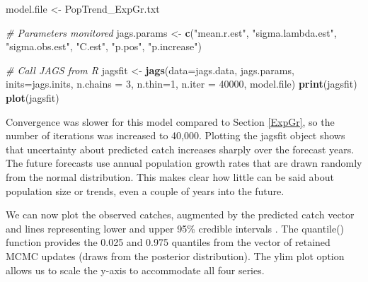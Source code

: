 \documentclass[
]{krantz}
\makeatletter
\newenvironment{Shaded}{\begin{snugshade}}{\end{snugshade}}
\newcommand{\AttributeTok}[1]{\textcolor[rgb]{0.27,0.27,0.27}{#1}}
\newcommand{\CommentTok}[1]{\textcolor[rgb]{0.37,0.37,0.37}{\textit{#1}}}
\newcommand{\DecValTok}[1]{\textcolor[rgb]{0.06,0.06,0.06}{#1}}
\newcommand{\FunctionTok}[1]{\textcolor[rgb]{0.27,0.27,0.27}{\textbf{#1}}}
\newcommand{\NormalTok}[1]{#1}
\newcommand{\OtherTok}[1]{\textcolor[rgb]{0.37,0.37,0.37}{#1}}
\newcommand{\StringTok}[1]{\textcolor[rgb]{0.5,0.5,0.5}{#1}}
\newenvironment{kframe}{%
\medskip{}
\setlength{\fboxsep}{.8em}
 \def\at@end@of@kframe{}%
 \ifinner\ifhmode%
  \def\at@end@of@kframe{\end{minipage}}%
  \begin{minipage}{\columnwidth}%
 \fi\fi%
 \def\FrameCommand##1{\hskip\@totalleftmargin \hskip-\fboxsep
 \colorbox{shadecolor}{##1}\hskip-\fboxsep
     \hskip-\linewidth \hskip-\@totalleftmargin \hskip\columnwidth}%
 \MakeFramed {\advance\hsize-\width
   \@totalleftmargin\z@ \linewidth\hsize
   \@setminipage}}%
 {\par\unskip\endMakeFramed%
 \at@end@of@kframe}
\renewenvironment{Shaded}{\begin{kframe}}{\end{kframe}}
\makeatother
\begin{document}
\begin{Shaded}
\begin{Highlighting}[]
\NormalTok{model.file }\OtherTok{\textless{}{-}} \StringTok{\textquotesingle{}PopTrend\_ExpGr.txt\textquotesingle{}}

\CommentTok{\# Parameters monitored}
\NormalTok{jags.params }\OtherTok{\textless{}{-}} \FunctionTok{c}\NormalTok{(}\StringTok{"mean.r.est"}\NormalTok{, }\StringTok{"sigma.lambda.est"}\NormalTok{, }\StringTok{"sigma.obs.est"}\NormalTok{, }\StringTok{"C.est"}\NormalTok{,}
                 \StringTok{"p.pos"}\NormalTok{, }\StringTok{"p.increase"}\NormalTok{)}

\CommentTok{\# Call JAGS from R}
\NormalTok{jagsfit }\OtherTok{\textless{}{-}} \FunctionTok{jags}\NormalTok{(}\AttributeTok{data=}\NormalTok{jags.data, jags.params, }\AttributeTok{inits=}\NormalTok{jags.inits,}
                \AttributeTok{n.chains =} \DecValTok{3}\NormalTok{, }\AttributeTok{n.thin=}\DecValTok{1}\NormalTok{, }\AttributeTok{n.iter =} \DecValTok{40000}\NormalTok{,}
\NormalTok{                model.file)}
\FunctionTok{print}\NormalTok{(jagsfit)}
\FunctionTok{plot}\NormalTok{(jagsfit)}
\end{Highlighting}
\end{Shaded}

Convergence was slower for this model compared to Section \ref{ExpGr}, so the number of iterations was increased to 40,000. Plotting the jagsfit object shows that uncertainty about predicted catch increases sharply over the forecast years. The future forecasts use annual population growth rates that are drawn randomly from the normal distribution. This makes clear how little can be said about population size or trends, even a couple of years into the future.

We can now plot the observed catches, augmented by the predicted catch vector and lines representing lower and upper 95\% credible intervals \citep{kéry.schaub_2011}. The quantile() function provides the 0.025 and 0.975 quantiles from the vector of retained MCMC updates (draws from the posterior distribution). The ylim plot option allows us to scale the y-axis to accommodate all four series.
\end{document}
